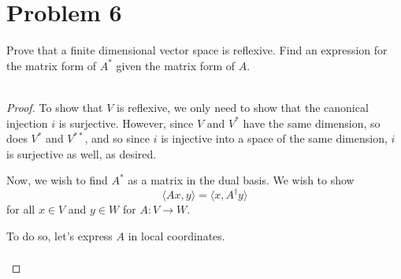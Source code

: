 \documentclass[fontsize=11pt]{scrartcl} %
\numberwithin{equation}{section} %
\numberwithin{figure}{section} %
\numberwithin{table}{section} %
\begin{document}
\section*{Problem 6}
Prove that a finite dimensional vector space is reflexive. Find an expression
for the matrix form of $A^*$ given the matrix form of $A$.
\\
\\
\begin{proof}
    To show that $V$ is reflexive, we only need to show that the canonical
    injection $i$ is surjective. However, since $V$ and $V^*$ have the same
    dimension, so does $V^*$ and $V^{**}$, and so since $i$ is injective into a
    space of the same dimension, $i$ is surjective as well, as desired.

    Now, we wish to find $A^*$ as a matrix in the dual basis. We wish to show
    \[
        \langle Ax,y\rangle = \langle x,A^{\dagger}y\rangle
    \]
    for all $x\in V$ and $y\in W$ for $A:V\to W$.

    To do so, let's express $A$ in local coordinates.

    \[
        \begin{aligned}

        \end{aligned}
    \]
\end{proof}
\end{document}
